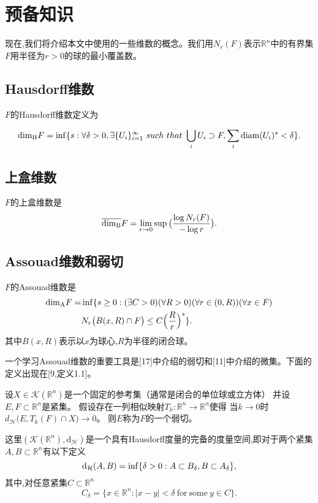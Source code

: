 \section{预备知识}
现在,我们将介绍本文中使用的一些维数的概念。我们用$N_r(F)$表示$\mathbb{R}^n$中的有界集$F$用半径为$r>0$的球的最小覆盖数。

\subsection{Hausdorff维数}
$F$的Hausdorff维数定义为

$$
\mathrm{\dim_H} F=\inf\{s:\forall\delta>0,\exists\{U_i\}_{i=1}^\infty ~such~that~ \bigcup_iU_i\supset F, \sum_i \mathrm{diam}(U_i)^s<\delta\}.
$$

\subsection{上盒维数}
$F$的上盒维数是
$$
\overline{\mathrm{\dim_B}}F= \lim\limits_{r\rightarrow0} \sup\big(\frac{\log N_r(F)}{-\log r}\big).
$$
\subsection{Assouad维数和弱切}
$F$的Assouad维数是
$$
\begin{aligned}
      \mathrm{\dim_A} F=&\inf\{s\ge0:(\exists C>0)(\forall R>0)(\forall r\in(0,R))(\forall x\in F)\\
      &N_r\big(B(x,R)\cap F\big)\le C\Big(\frac{R}{r}\Big)^s\}.
\end{aligned}
$$
其中$B(x,R)$表示以$x$为球心,$R$为半径的闭合球。

一个学习Assouad维数的重要工具是[17]中介绍的弱切和[11]中介绍的微集。下面的定义出现在[9,定义1.1]。

\begin{definition}
      设$X\in\mathcal{K}(\mathbb{R}^n)$是一个固定的参考集（通常是闭合的单位球或立方体）
      并设$E,F\subset\mathbb{R}^n$是紧集。
      假设存在一列相似映射$T_k:\mathbb{R}^n\rightarrow\mathbb{R}^n$使得
      当$k\rightarrow0$时$d_\mathcal{H}\big(E,T_k(F)\cap X\big)\rightarrow0$。
      则$E$称为$F$的一个弱切。
\end{definition}

这里$(\mathcal{K}(\mathbb{R}^n),\mathrm{d}_\mathcal{H})$是一个具有Hausdorff度量的完备的度量空间,即对于两个紧集
$A,B\subset\mathbb{R}^n$有以下定义
$$
\mathrm{d}_\mathcal{H}(A,B)=\inf\{\delta>0:A\subset B_\delta,B\subset A_\delta\},
$$
其中,对任意紧集$C\subset\mathbb{R}^n$
$$
C_\delta=\{x\in\mathbb{R}^n:|x-y|<\delta ~\mathrm{for~some}~ y\in C\}.
$$

